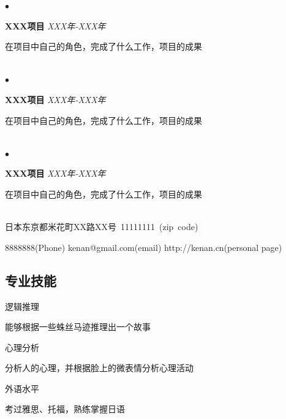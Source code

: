 \documentclass[CJKutf8]{tccv}
\begin{document}
\begin{CJK*}{UTF8}{gbsn}
\begin{factlist}
   \item{$\bullet$}
    {\textbf{XXX项目} \hfill \small\textit{XXX年-XXX年}\\
      \RaggedRight \begin{CJK*}{UTF8}{gkai} \normalsize
        在项目中自己的角色，完成了什么工作，项目的成果\\ \ 
      \end{CJK*}}
      
     \item{$\bullet$}
    {\textbf{XXX项目} \hfill \small\textit{XXX年-XXX年}\\
      \RaggedRight \begin{CJK*}{UTF8}{gkai} \normalsize
        在项目中自己的角色，完成了什么工作，项目的成果\\ \ 
      \end{CJK*}}
      
      \item{$\bullet$}
    {\textbf{XXX项目} \hfill \small\textit{XXX年-XXX年}\\
      \RaggedRight \begin{CJK*}{UTF8}{gkai} \normalsize
        在项目中自己的角色，完成了什么工作，项目的成果\\ \ 
      \end{CJK*}}

  \end{factlist}


  \rule{0pt}{22ex}
  \personal
  {\begin{CJK*}{UTF8}{gkai}日本东京都米花町XX路XX号\ 11111111\ (zip\ code)\end{CJK*}}
  {8888888(Phone)}
  {kenan@gmail.com(email)}
  {http://kenan.cn(personal page)}


  \rule{0pt}{1ex}
  \begin{CJK*}{UTF8}{gkai}
    \section{\LARGE \textbf{专业技能}}
  \end{CJK*}
  \begin{factlist}
  \item{逻辑推理}
    {\RaggedRight \begin{CJK*}{UTF8}{gkai}能够根据一些蛛丝马迹推理出一个故事\end{CJK*}}
  \item{心理分析}
    {\RaggedRight \begin{CJK*}{UTF8}{gkai}分析人的心理，并根据脸上的微表情分析心理活动\end{CJK*}}
  \item{外语水平}
    {\RaggedRight \begin{CJK*}{UTF8}{gkai}考过雅思、托福，熟练掌握日语\end{CJK*}}
  \end{factlist}


\end{CJK*}
\end{document}
